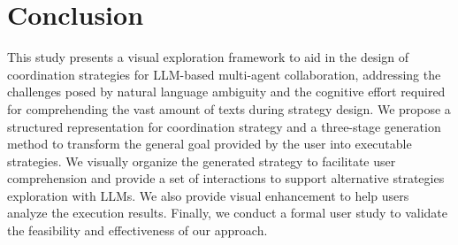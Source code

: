 \section{Conclusion}
This study presents a visual exploration framework to aid in the design of coordination strategies for LLM-based multi-agent collaboration, addressing the challenges posed by natural language ambiguity and the cognitive effort required for comprehending the vast amount of texts during strategy design. We propose a structured representation for coordination strategy and a three-stage generation method to transform the general goal provided by the user into executable strategies. We visually organize the generated strategy to facilitate user comprehension and provide a set of interactions to support alternative strategies exploration with LLMs. We also provide visual enhancement to help users analyze the execution results. Finally, we conduct a formal user study to validate the feasibility and effectiveness of our approach.



